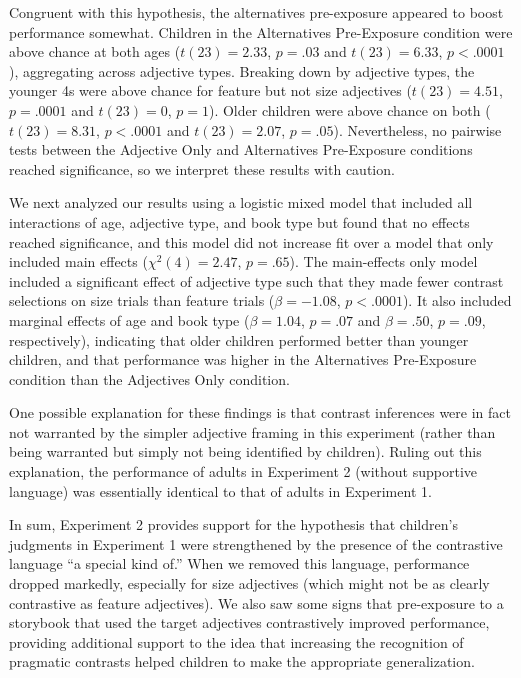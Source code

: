 \documentclass[man]{apa2}
\begin{document}
Congruent with this hypothesis, the alternatives pre-exposure appeared to boost performance somewhat. Children in the Alternatives Pre-Exposure condition were above chance at both ages ($t(23) = 2.33$, $p = .03$ and $t(23) = 6.33$, $p < .0001$), aggregating across adjective types. Breaking down by adjective types, the younger 4s were above chance for feature but not size adjectives ($t(23) = 4.51$, $p = .0001$ and $t(23)=0$, $p = 1$). Older children were above chance on both ($t(23) = 8.31$, $p < .0001$ and $t(23)= 2.07$, $p = .05$). Nevertheless, no pairwise tests between the Adjective Only and Alternatives Pre-Exposure conditions reached significance, so we interpret these results with caution. 

We next analyzed our results using a logistic mixed model that included all interactions of age, adjective type, and book type but found that no effects reached significance, and this model did not increase fit over a model that only included main effects ($\chi^2(4) = 2.47$, $p = .65$). The main-effects only model included a significant effect of adjective type such that they made fewer contrast selections on size trials than feature trials ($\beta = -1.08$, $p < .0001$). It also included marginal effects of age and book type ($\beta = 1.04$, $p = .07$ and $\beta = .50$, $p = .09$, respectively), indicating that older children performed better than younger children, and that performance was higher in the Alternatives Pre-Exposure condition than the Adjectives Only condition. 


One possible explanation for these findings is that contrast inferences were in fact not warranted by the simpler adjective framing in this experiment (rather than being warranted but simply not being identified by children). Ruling out this explanation, the performance of adults in Experiment 2 (without supportive language) was essentially identical to that of adults in Experiment 1. 


In sum, Experiment 2 provides support for the hypothesis that children's judgments in Experiment 1 were strengthened by the presence of the contrastive language ``a special kind of.'' When we removed this language, performance dropped markedly, especially for size adjectives (which might not be as clearly contrastive as feature adjectives). We also saw some signs that pre-exposure to a storybook that used the target adjectives contrastively improved performance, providing additional support to the idea that increasing the recognition of pragmatic contrasts helped children to make the appropriate generalization. 
\end{document}
